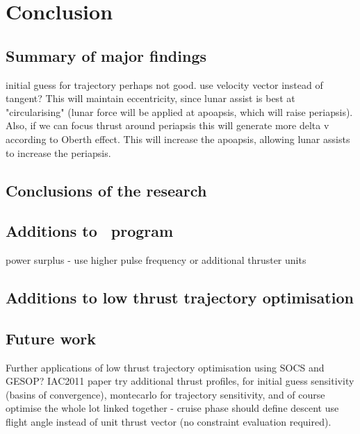 \chapter{Conclusion} \label{cha:Conclusion}

\section{Summary of major findings}
initial guess for trajectory perhaps not good. use velocity vector instead of tangent? This will maintain eccentricity, since lunar assist is best at "circularising" (lunar force will be applied at apoapsis, which will raise periapsis).
Also, if we can focus thrust around periapsis this will generate more delta v according to Oberth effect. This will increase the apoapsis, allowing lunar assists to increase the periapsis.

\section{Conclusions of the research}

\section{Additions to \BW\ program}
power surplus - use higher pulse frequency or additional thruster units

\section{Additions to low thrust trajectory optimisation}

\section{Future work}
Further applications of low thrust trajectory optimisation using SOCS and GESOP? IAC2011 paper
try additional thrust profiles, for initial guess sensitivity (basins of convergence), montecarlo for trajectory sensitivity, and of course optimise the whole lot linked together - cruise phase should define descent
use flight angle instead of unit thrust vector (no constraint evaluation required).
